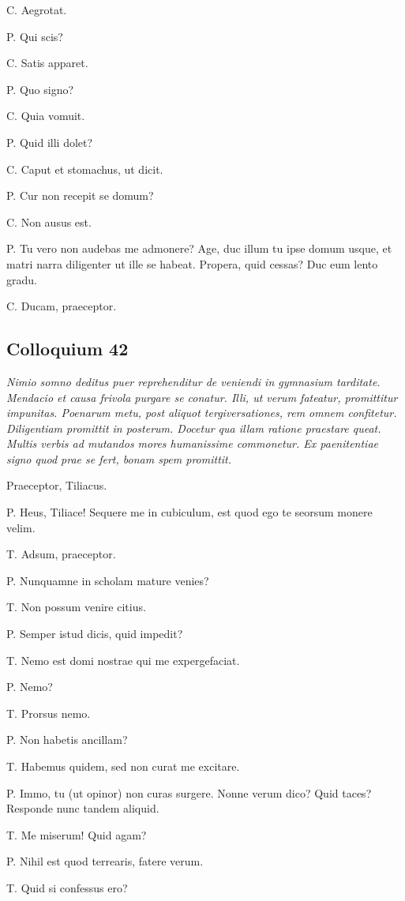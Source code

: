 \documentclass{article}
\begin{document}
C. Aegrotat.

P. Qui scis?

C. Satis apparet.

P. Quo signo?

C. Quia vomuit.

P. Quid illi dolet?

C. Caput et stomachus, ut dicit.

P. Cur non recepit se domum?

C. Non ausus est.

P. Tu vero non audebas me admonere? Age, duc illum tu ipse domum usque, et matri narra diligenter ut ille se habeat. Propera, quid cessas? Duc eum lento gradu.

C. Ducam, praeceptor.

\subsection{Colloquium 42}
\emph{Nimio somno deditus puer reprehenditur de veniendi in gymnasium tarditate. Mendacio et causa frivola purgare se conatur. Illi, ut verum fateatur, promittitur impunitas. Poenarum metu, post aliquot tergiversationes, rem omnem confitetur. Diligentiam promittit in posterum. Docetur qua illam ratione praestare queat. Multis verbis ad mutandos mores humanissime commonetur. Ex paenitentiae signo quod prae se fert, bonam spem promittit.}

Praeceptor, Tiliacus.

P. Heus, Tiliace! Sequere me in cubiculum, est quod ego te seorsum monere velim.

T. Adsum, praeceptor.

P. Nunquamne in scholam mature venies?

T. Non possum venire citius.

P. Semper istud dicis, quid impedit?

T. Nemo est domi nostrae qui me expergefaciat.

P. Nemo?

T. Prorsus nemo.

P. Non habetis ancillam?

T. Habemus quidem, sed non curat me excitare.

P. Immo, tu (ut opinor) non curas surgere. Nonne verum dico? Quid taces? Responde nunc tandem aliquid.

T. Me miserum! Quid agam?

P. Nihil est quod terrearis, fatere verum.

T. Quid si confessus ero?
\end{document}

